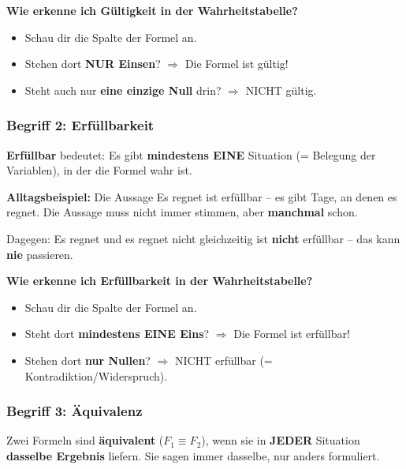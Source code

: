 \documentclass[a4paper,12pt]{article}
\begin{document}
\textbf{Wie erkenne ich G\"ultigkeit in der Wahrheitstabelle?}
\begin{itemize}
\item Schau dir die Spalte der Formel an.
\item Stehen dort \textbf{NUR Einsen}? $\Rightarrow$ Die Formel ist g\"ultig!
\item Steht auch nur \textbf{eine einzige Null} drin? $\Rightarrow$ NICHT g\"ultig.
\end{itemize}

\bigskip

\subsubsection*{Begriff 2: Erf\"ullbarkeit}

\begin{merkbox}
\textbf{Erf\"ullbar} bedeutet: Es gibt \textbf{mindestens EINE} Situation (= Belegung der Variablen), in der die Formel wahr ist.
\end{merkbox}

\begin{analogie}
\textbf{Alltagsbeispiel:} Die Aussage \glqq Es regnet\grqq{} ist erf\"ullbar -- es gibt Tage, an denen es regnet. Die Aussage muss nicht immer stimmen, aber \textbf{manchmal} schon.

\smallskip
Dagegen: \glqq Es regnet und es regnet nicht gleichzeitig\grqq{} ist \textbf{nicht} erf\"ullbar -- das kann \textbf{nie} passieren.
\end{analogie}

\textbf{Wie erkenne ich Erf\"ullbarkeit in der Wahrheitstabelle?}
\begin{itemize}
\item Schau dir die Spalte der Formel an.
\item Steht dort \textbf{mindestens EINE Eins}? $\Rightarrow$ Die Formel ist erf\"ullbar!
\item Stehen dort \textbf{nur Nullen}? $\Rightarrow$ NICHT erf\"ullbar (= Kontradiktion/Widerspruch).
\end{itemize}

\bigskip

\subsubsection*{Begriff 3: \"Aquivalenz}

\begin{merkbox}
Zwei Formeln sind \textbf{\"aquivalent} ($F_1 \equiv F_2$), wenn sie in \textbf{JEDER} Situation \textbf{dasselbe Ergebnis} liefern. Sie sagen immer dasselbe, nur anders formuliert.
\end{merkbox}
\end{document}
